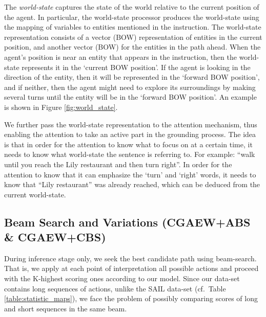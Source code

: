 \documentclass[11pt,a4paper]{article}
\begin{document}
The {\em world-state} captures the state of the world relative to the current position of the agent.
In particular, the world-state processor produces the world-state using the mapping of 
variables to entities mentioned in the instruction. The world-state representation  %
consists of a vector (BOW) representation of entities in the current position, and another  vector (BOW) for the entities in the path ahead. 
When the agent's position is near an entity that appears in the instruction, then the world-state represents it in the \enquote*{current BOW position}. If the agent is looking in the direction of the entity, then it will be represented in the \enquote*{forward BOW position}, and if neither, then the agent might need to explore its surroundings by making several turns until the entity will be  in the \enquote*{forward BOW position}. An example is shown in Figure \ref{fig:world_state}.  


We further pass the world-state representation to the attention mechanism, thus enabling the attention to take an active part in the grounding process. The idea is that in order for the attention to know what to focus on at a certain time, it needs to know what world-state the sentence is referring to. For example: \enquote{walk until you reach the Lily restaurant and then turn right}. In order for the attention to know that it can emphasize the \enquote*{turn} and \enquote*{right} words, it needs to know that \enquote{Lily restaurant} was already reached, which can be deduced from the current world-state.\par



\subsection{Beam Search and Variations (CGAEW+ABS \& CGAEW+CBS)}
During inference stage only, we seek the best candidate path using beam-search. That is, we apply at each point of interpretation all possible actions and proceed with the K-highest scoring ones according to our model.
Since our data-set contains long sequences of actions, unlike the SAIL data-set (cf.\ Table \ref{table:statistic_maps}), we face the problem of possibly comparing scores of long  and short sequences in the same beam.
\end{document}

